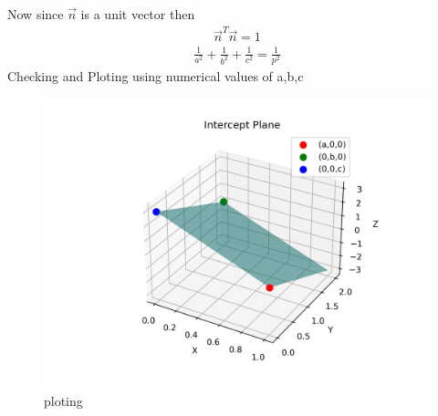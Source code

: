 \documentclass[12pt]{article}
\begin{document}
Now since $\Vec{n}$ is a unit vector then 
\begin{align}
    \Vec{n}^T\Vec{n}=1
\end{align}
\begin{align}
    \frac{1}{a^2}+\frac{1}{b^2}+\frac{1}{c^2}=\frac{1}{p^2}
\end{align}
\newpage
Checking and Ploting using numerical values of a,b,c
\begin{figure}[h]
    \centering
    \includegraphics[width=0.5\linewidth]{figures/intercept_plane.png}
    \caption{ploting}
    \label{fig:placeholder}
\end{figure}
\end{document}
